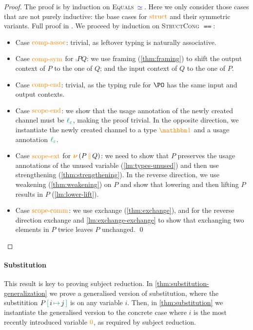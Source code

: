 \begin{proof}[Proof]
  The proof is by induction on \textsc{Equals} $\eq{}$.
  Here we only consider those cases that are not purely inductive: the base cases for $\constr{struct}$ and their symmetric variants.
  Full proof in \cite{Zalakain2020Agda}.
  We proceed by induction on \textsc{StructCong} $\eqeq$:
  \begin{itemize}
    \item
      Case $\constr{comp-assoc}$: trivial, as leftover typing is naturally associative.
    \item
      Case $\constr{comp-sym}$ for $\comp{P}{Q}$: we use framing (\autoref{thm:framing}) to shift the output context of $P$ to the one of $Q$; and the input context of $Q$ to the one of $P$.
    \item
      Case $\constr{comp-end}$: trivial, as the typing rule for $\PO$ has the same input and output contexts.
    \item
      Case $\constr{scope-end}$: we show that the usage annotation of the newly created channel must be $\lz$, making the proof trivial.
      In the opposite direction, we instantiate the newly created channel to a type $\unit$ and a usage annotation $\lz$.
    \item
      Case $\constr{scope-ext}$ for $\new (\comp{P}{Q})$: we need to show that $P$ preserves the usage annotations of the unused variable (\autoref{lm:types-unused}) and then use strengthening (\autoref{thm:strengthening}).
      In the reverse direction, we use weakening (\autoref{thm:weakening}) on $P$ and show that lowering and then lifting $P$ results in $P$ (\autoref{lm:lower-lift}).
    \item
      Case $\constr{scope-comm}$:
      we use exchange (\autoref{thm:exchange}), and for the reverse direction exchange and \autoref{lm:exchange-exchange} to show that exchanging two elements in $P$ twice leaves $P$ unchanged. \qed
  \end{itemize}
\end{proof}

\paragraph*{Substitution}
This result is key to proving subject reduction.
In \autoref{thm:substitution-generalization} we prove a generalised version of substitution, where the substitition $\subst{P}{j}{i}$ is on any variable $i$.
Then, in \autoref{thm:substitution} we instantiate the generalised version to the concrete case where $i$ is the most recently introduced variable $\constr{0}$, as required by subject reduction.

